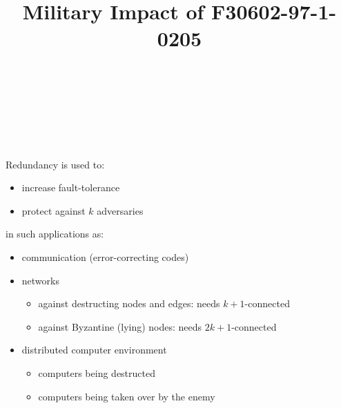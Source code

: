 \documentclass[portrait]{seminar}
\begin{document}
\title{{Military Impact of  F30602-97-1-0205}}
\author{ \\ 
\\
\\
\\
}

\maketitle

\newpage

\section*{}

\newpage

\section*{}

Redundancy is used to: 

\begin{itemize}
\item increase fault-tolerance
\item protect against $k$ adversaries
\end{itemize}
in such applications as:

\begin{itemize}
\item communication (error-correcting codes)
\item networks
\begin{itemize}
\item against destructing nodes and edges: needs $k+1$-connected

\vskip 10pt


\item against Byzantine (lying) nodes: needs $2k+1$-connected

\vskip 10pt

\end{itemize}
\item distributed computer environment
\begin{itemize}
\item computers being destructed
\item computers being taken over by the enemy
\end{itemize}
\end{itemize}
\end{document}
